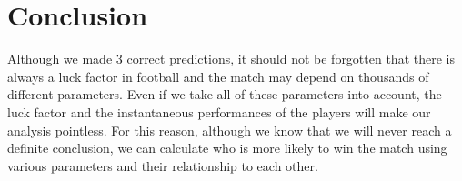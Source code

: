 \documentclass[conference]{IEEEtran}
\begin{document}
\section{Conclusion}
Although we made 3 correct predictions, it should not be forgotten that there is always a luck factor in football and the match may depend on thousands of different parameters. Even if we take all of these parameters into account, the luck factor and the instantaneous performances of the players will make our analysis pointless. For this reason, although we know that we will never reach a definite conclusion, we can calculate who is more likely to win the match using various parameters and their relationship to each other.
\end{document}
